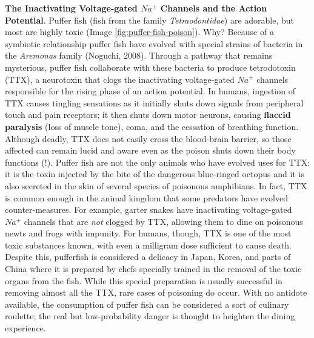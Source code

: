 \documentclass[
]{book}
\begin{document}
\textbf{The Inactivating Voltage-gated \(Na^+\) Channels and the Action Potential}. Puffer fish (fish from the family \emph{Tetraodontidae}) are adorable, but most are highly toxic (Image \ref{fig:puffer-fish-poison}). Why? Because of a symbiotic relationship puffer fish have evolved with special strains of bacteria in the \emph{Aremonas} family (Noguchi, 2008). Through a pathway that remains mysterious, puffer fish collaborate with these bacteria to produce tetrodotoxin (TTX), a neurotoxin that clogs the inactivating voltage-gated \(Na^+\) channels responsible for the rising phase of an action potential. In humans, ingestion of TTX causes tingling sensations as it initially shuts down signals from peripheral touch and pain receptors; it then shuts down motor neurons, causing \textbf{flaccid paralysis} (loss of muscle tone), coma, and the cessation of breathing function. Although deadly, TTX does not easily cross the blood-brain barrier, so those affected can remain lucid and aware even as the poison shuts down their body functions (!). Puffer fish are not the only animals who have evolved uses for TTX: it is the toxin injected by the bite of the dangerous blue-ringed octopus and it is also secreted in the skin of several species of poisonous amphibians. In fact, TTX is common enough in the animal kingdom that some predators have evolved counter-measures. For example, garter snakes have inactivating voltage-gated \(Na^+\) channels that are \emph{not} clogged by TTX, allowing them to dine on poisonous newts and frogs with impunity. For humans, though, TTX is one of the most toxic substances known, with even a milligram dose sufficient to cause death. Despite this, pufferfish is considered a delicacy in Japan, Korea, and parts of China where it is prepared by chefs specially trained in the removal of the toxic organs from the fish. While this special preparation is usually successful in removing almost all the TTX, rare cases of poisoning do occur. With no antidote available, the consumption of puffer fish can be considered a sort of culinary roulette; the real but low-probability danger is thought to heighten the dining experience.
\end{document}
